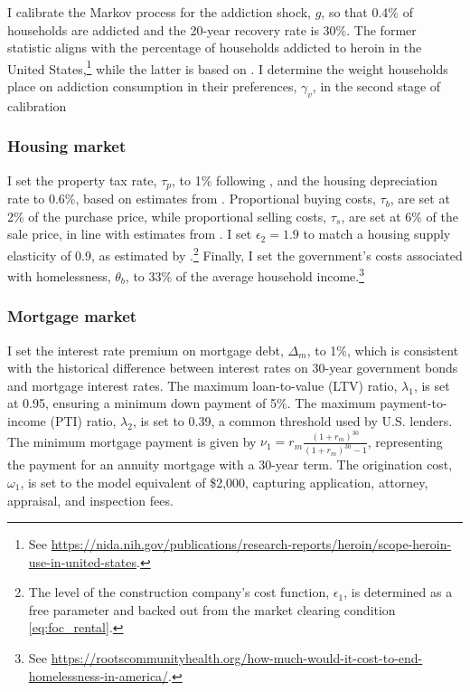\documentclass[parskip=full]{article}
\begin{document}
I calibrate the Markov process for the addiction shock, $g$, so that 0.4\% of households are addicted and the 20-year recovery rate is 30\%. The former statistic aligns with the percentage of households addicted to heroin in the United States,\footnote{See \url{https://nida.nih.gov/publications/research-reports/heroin/scope-heroin-use-in-united-states}.} while the latter is based on \citet{hseretal-2015}. I determine the weight households place on addiction consumption in their preferences, $\gamma_{v}$, in the second stage of calibration

\subsubsection{Housing market}

I set the property tax rate, $\tau_p$, to 1\% following \citet{sommeretal-2013}, and the housing depreciation rate to 0.6\%, based on estimates from \citet{rosenthal-2014}. Proportional buying costs, $\tau_b$, are set at 2\% of the purchase price, while proportional selling costs, $\tau_s$, are set at 6\% of the sale price, in line with estimates from \citet{gm-2003}. I set $\epsilon_2 = 1.9$ to match a housing supply elasticity of 0.9, as estimated by \citet{sommersullivan-2017}.\footnote{The level of the construction company's cost function, $\epsilon_1$, is determined as a free parameter and backed out from the market clearing condition \eqref{eq:foc_rental}.} Finally, I set the government's costs associated with homelessness, $\theta_b$, to 33\% of the average household income.\footnote{See \url{https://rootscommunityhealth.org/how-much-would-it-cost-to-end-homelessness-in-america/}.}

\subsubsection{Mortgage market}
I set the interest rate premium on mortgage debt, $\Delta_m$, to 1\%, which is consistent with the historical difference between interest rates on 30-year government bonds and mortgage interest rates. The maximum loan-to-value (LTV) ratio, $\lambda_1$, is set at 0.95, ensuring a minimum down payment of 5\%. The maximum payment-to-income (PTI) ratio, $\lambda_2$, is set to 0.39, a common threshold used by U.S. lenders. The minimum mortgage payment is given by $\nu_1 = r_m \frac{(1+r_m)^{30}}{(1+r_m)^{30}-1}$, representing the payment for an annuity mortgage with a 30-year term. The origination cost, $\omega_1$, is set to the model equivalent of \$2,000, capturing application, attorney, appraisal, and inspection fees.
\end{document}
